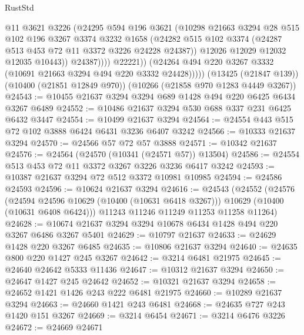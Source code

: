 \begin{lexlean}{RustStd}
\begin{coremodule}
{\begin{coremodule}
{{{{{{{{{{{{{{{{{{{{{{{{{                      @11
                      @3621
                      @3226
                      (@24295
                        @594
                        @196
                        @3621
                        (@10298
                          @21663
                          @3294
                          @28
                          @515
                          @102
                          @196
                          @3267
                          @3374
                          @3232
                          @1658
                          (@24282
                            @515
                            @102
                            @3374
                            (@24287 @513 @453 @72 @11 @3372 @3226 @24228 @24387))
                          @12026
                          @12029
                          @12032
                          @12035
                          @10443))
                      @24387))))
              @22221))
          (@24264 @494 @220 @3267 @3332 (@10691 @21663 @3294 @494 @220 @3332 @24428)))))
    (@13425 (@21847 @139))
    (@10400 (@21851 @12849 @970))
    (@10266 (@21858 @970 @1283 @4449 @3267))
@24543 := @10455 @21637 @3294 @3294 @689 @1428 @494 @220 @6425 @6434 @3267 @6489
@24552 := @10486 @21637 @3294 @530 @688 @337 @231 @6425 @6432 @3447
@24554 := @10499 @21637 @3294
@24564 := @24554 @443 @515 @72 @102 @3888 @6424 @6431 @3236 @6407 @3242
@24566 := @10333 @21637 @3294
@24570 := @24566 @57 @72 @57 @3888
@24571 := @10342 @21637
@24576 := @24564 (@24570 (@10341 (@24571 @57)) @13504)
@24586 := @24554 @513 @453 @72 @11 @3372 @3267 @3226 @3236 @6417 @3242
@24593 := @10387 @21637 @3294 @72 @512 @3372 @10981 @10985
@24594 := @24586 @24593
@24596 := @10624 @21637 @3294
@24616 := @24543
    (@24552
      (@24576
        (@24594 @24596 @10629 (@10400 (@10631 @6418 @3267)))
        @10629
        (@10400 (@10631 @6408 @6424)))
      @11243
      @11246
      @11249
      @11253
      @11258
      @11264)
@24628 := @10674 @21637 @3294 @3294 @10678 @6434 @1428 @494 @220 @3267 @6486 @3267 @5401
@24629 := @10797 @21637
@24633 := @24629 @1428 @220 @3267 @6485
@24635 := @10806 @21637 @3294
@24640 := @24635 @800 @220 @1427 @245 @3267
@24642 := @3214 @6481 @21975
@24645 := @24640 @24642 @5333 @11436
@24647 := @10312 @21637 @3294
@24650 := @24647 @1427 @245 @24642
@24652 := @10321 @21637 @3294
@24658 := @24652 @1421 @1426 @243 @222 @6481 @21975
@24660 := @10289 @21637 @3294
@24663 := @24660 @1421 @243 @6481
@24668 := @24635 @727 @243 @1420 @151 @3267
@24669 := @3214 @6454
@24671 := @3214 @6476 @3226
@24672 := @24669 @24671
}}}}}}}}}}}}}}}}}}}}}}}}}
\end{coremodule}}
\end{coremodule}
\end{lexlean}
